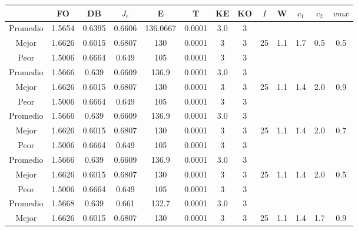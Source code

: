 \begin{table}[h!]
    \footnotesize
    \begin{center}
        \begin{tabular}{|c|c|c|c|c|c|c|c|c|c|c|c|c|}
        \hline
            & {\bf FO} & {\bf DB} & $J_e$ & {\bf E} & {\bf T} & {\bf KE} & {\bf KO} & $I$ & W & $c_1$ & $c_2$ & $vmx$ \\
        \hline
        \hline
            Promedio  & 1.5654 & 0.6395 & 0.6606 & 136.0667 & 0.0001 & 3.0 & 3 &  &  &  &  & \\
            \cline{1-8}
            Mejor & 1.6626 & 0.6015  & 0.6807 & 130 & 0.0001 & 3 & 3 & 25 & 1.1 & 1.7 & 0.5 & 0.5\\
            \cline{1-8}
            Peor & 1.5006 & 0.6664  & 0.649 & 105 & 0.0001 & 3 & 3 &  &  &  &  & \\
        \hline
        \hline
            Promedio  & 1.5666 & 0.639 & 0.6609 & 136.9 & 0.0001 & 3.0 & 3 &  &  &  &  & \\
            \cline{1-8}
            Mejor & 1.6626 & 0.6015  & 0.6807 & 130 & 0.0001 & 3 & 3 & 25 & 1.1 & 1.4 & 2.0 & 0.9\\
            \cline{1-8}
            Peor & 1.5006 & 0.6664  & 0.649 & 105 & 0.0001 & 3 & 3 &  &  &  &  & \\
        \hline
        \hline
            Promedio  & 1.5666 & 0.639 & 0.6609 & 136.9 & 0.0001 & 3.0 & 3 &  &  &  &  & \\
            \cline{1-8}
            Mejor & 1.6626 & 0.6015  & 0.6807 & 130 & 0.0001 & 3 & 3 & 25 & 1.1 & 1.4 & 2.0 & 0.7\\
            \cline{1-8}
            Peor & 1.5006 & 0.6664  & 0.649 & 105 & 0.0001 & 3 & 3 &  &  &  &  & \\
        \hline
        \hline
            Promedio  & 1.5666 & 0.639 & 0.6609 & 136.9 & 0.0001 & 3.0 & 3 &  &  &  &  & \\
            \cline{1-8}
            Mejor & 1.6626 & 0.6015  & 0.6807 & 130 & 0.0001 & 3 & 3 & 25 & 1.1 & 1.4 & 2.0 & 0.5\\
            \cline{1-8}
            Peor & 1.5006 & 0.6664  & 0.649 & 105 & 0.0001 & 3 & 3 &  &  &  &  & \\
        \hline
        \hline
            Promedio  & 1.5668 & 0.639 & 0.661 & 132.7 & 0.0001 & 3.0 & 3 &  &  &  &  & \\
            \cline{1-8}
            Mejor & 1.6626 & 0.6015  & 0.6807 & 130 & 0.0001 & 3 & 3 & 25 & 1.1 & 1.4 & 1.7 & 0.9\\

\end{tabular}
\end{center}
\end{table}
